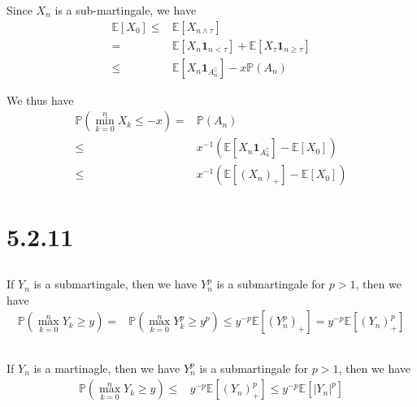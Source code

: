 \documentclass[11pt,a4paper]{ctexart}
\numberwithin{equation}{section}%
\begin{document}
Since $ X_n $ is a sub-martingale, we have
\begin{align*}
    \mathbb{E}\left[ X_0 \right]  \leq &\mathbb{E}\left[ X_{n \wedge \tau} \right] \\
    =& \mathbb{E}\left[ X_n\mathbf{1}_{n<\tau} \right] + \mathbb{E}\left[ X_\tau \mathbf{1}_{n\geq \tau} \right] \\
    \leq& \mathbb{E}\left[ X_n\mathbf{1}_{A_n^\complement} \right] - x\mathbb{P}\left( A_n \right) 
\end{align*}

We thus have
\begin{align*}
    \mathbb{P}\left( \mathop{ \min }\limits_{k=0}^n X_k \leq -x \right) =& \mathbb{P}\left( A_n \right) \\
    \leq& x^{-1}(\mathbb{E}\left[ X_n\mathbf{1}_{A_n^\complement} \right] -  \mathbb{E}\left[ X_0 \right] ) \\
    \leq& x^{-1}(\mathbb{E}\left[ (X_n)_+ \right] -  \mathbb{E}\left[ X_0 \right] )
\end{align*}


\section{5.2.11}

\subsection{}

If $ Y_n $ is a submartingale, then we have $ Y_n^p $ is a submartingale for $ p>1 $, then we have
\begin{align*}
    \mathbb{P}\left( \mathop{ \max }\limits_{k=0}^n Y_k\geq y  \right)  =& \mathbb{P}\left( \mathop{ \max }\limits_{k=0}^n Y_k^p\geq y^p  \right) 
    \leq y^{-p}\mathbb{E}\left[ (Y_n^p)_+ \right] 
    = y^{-p}\mathbb{E}\left[ (Y_n)_+^p \right]
\end{align*}

\subsection{}

If $ Y_n $ is a martinagle, then we have $ Y_n^p $ is a submartingale for $ p>1 $, then we have
\begin{align*}
    \mathbb{P}\left( \mathop{ \max }\limits_{k=0}^n Y_k\geq y  \right)  \leq&y^{-p}\mathbb{E}\left[ (Y_n)_+^p \right]
    \leq y^{-p}\mathbb{E}\left[ \left\vert Y_n \right\vert ^p \right] 
\end{align*}
\end{document}

